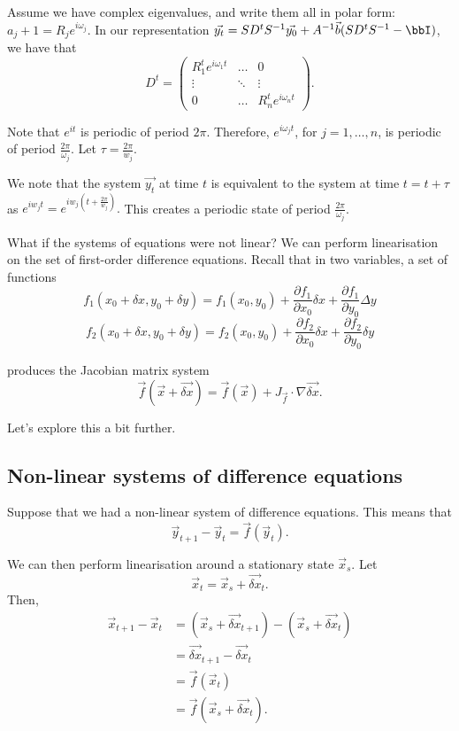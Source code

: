 \documentclass[a4paper, 12pt,oneside,openany]{book}
\begin{document}
Assume we have complex eigenvalues, and write them all in polar form: $a_j+1 = R_je^{i \omega_j}.$ In our representation $\vec{y_t} = SD^tS^{-1}\vec{y_0} + A^{-1}\vec{b}(SD^tS^{-1}-\bbI)$, we have that $$D^t = \begin{pmatrix} R_1^te^{i\omega_1t} & \dots & 0 \\ \vdots & \ddots & \vdots \\ 0 & \dots & R_n^te^{i\omega_nt} \end{pmatrix}.$$

Note that $e^{it}$ is periodic of period $2\pi$. Therefore, $e^{i\omega_jt}$, for $j = 1, \dots, n$, is periodic of period $\frac{2\pi}{\omega_j}$. Let $\tau=\frac{2\pi}{w_j}$. 

We note that the system $\vec{y_t}$ at time $t$ is equivalent to the system at time $t=t+\tau$ as $e^{iw_jt} = e^{iw_j(t+\frac{2\pi}{w_j})}.$ This creates a periodic state of period $\frac{2\pi}{\omega_j}$.

What if the systems of equations were not linear? We can perform linearisation on the set of first-order difference equations. Recall that in two variables, a set of functions $$f_1(x_0 + \delta x, y_0+\delta y) = f_1(x_0, y_0) + \frac{\partial f_1}{\partial x_0} \delta x + \frac{\partial f_1}{\partial y_0} \Delta y $$ $$f_2(x_0 + \delta x, y_0+\delta y) = f_2(x_0, y_0) + \frac{\partial f_2}{\partial x_0} \delta x + \frac{\partial f_2}{\partial y_0} \delta y $$

produces the Jacobian matrix system $$\vec{f}(\vec{x}+\vec{\delta x}) = \vec{f}(\vec{x}) + J_{\vec{f}} \cdot \nabla \vec{\delta x}. $$

Let's explore this a bit further.

\subsection{Non-linear systems of difference equations}

Suppose that we had a non-linear system of difference equations. This means that $$\vec{y}_{t+1}-\vec{y}_t = \vec{f}(\vec{y}_t).$$ 

We can then perform linearisation around a stationary state $\vec{x}_s$. Let $$\vec{x}_t = \vec{x}_s + \vec{\delta x}_t.$$ Then, \begin{align*} \vec{x}_{t+1}-\vec{x}_t &= (\vec{x}_s + \vec{\delta x}_{t+1}) - (\vec{x}_s + \vec{\delta x}_t)\\&=\vec{\delta x}_{t+1}-\vec{\delta x}_t \\ &= \vec{f}(\vec{x}_t) \\ &= \vec{f}(\vec{x}_s + \vec{\delta x}_t).\end{align*}
\end{document}
